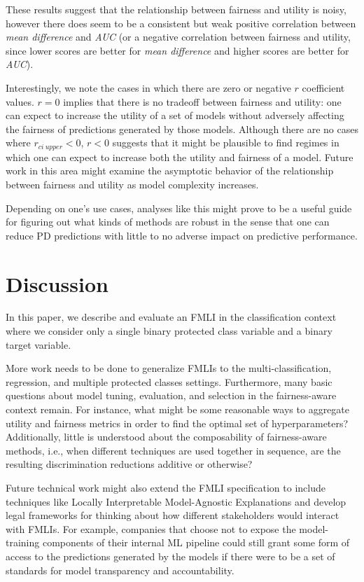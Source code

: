 \documentclass{interact}
\begin{document}
These results suggest that the relationship between fairness and utility is
noisy, however there does seem to be a consistent but weak positive correlation
between \emph{mean difference} and \emph{AUC} (or a negative correlation between
fairness and utility, since lower scores are better for \emph{mean difference}
and higher scores are better for \emph{AUC}).

Interestingly, we note the cases in which there are zero or negative \(r\)
coefficient values. \(r = 0\) implies that there is no tradeoff between fairness
and utility: one can expect to increase the utility of a set of models without
adversely affecting the fairness of predictions generated by those models.
Although there are no cases where \(r_{ci\ upper} < 0\), \(r < 0\) suggests that
it might be plausible to find regimes in which one can expect to increase both
the utility and fairness of a model. Future work in this area might examine the
asymptotic behavior of the relationship between fairness and utility as model
complexity increases.

Depending on one's use cases, analyses like this might prove to be a useful
guide for figuring out what kinds of methods are robust in the sense that one
can reduce PD predictions with little to no adverse
impact on predictive performance.

\section{Discussion}

In this paper, we describe and evaluate an FMLI in the classification context
where we consider only a single binary protected class variable and a binary
target variable.

More work needs to be done to generalize FMLIs to the multi-classification,
regression, and multiple protected classes settings. Furthermore, many basic
questions about model tuning, evaluation, and selection in the fairness-aware
context remain. For instance, what might be some reasonable ways to aggregate
utility and fairness metrics in order to find the optimal set of
hyperparameters? Additionally, little is understood about the composability of
fairness-aware methods, i.e., when different techniques are used together in
sequence, are the resulting discrimination reductions additive or otherwise?

Future technical work might also extend the FMLI specification to include
techniques like Locally Interpretable Model-Agnostic Explanations
\cite{ribeiro2016should} and develop legal frameworks for thinking about how
different stakeholders would interact with FMLIs. For example, companies that
choose not to expose the model-training components of their internal ML
pipeline could still grant some form of access to the predictions generated by
the models if there were to be a set of standards for model transparency and
accountability.
\end{document}
